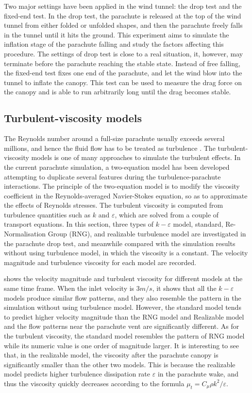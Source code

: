 Two major settings have been applied in the wind tunnel: the drop test and the fixed-end test. In the drop test, the parachute is released at the top of the wind tunnel from either folded or unfolded shapes, and then the parachute freely falls in the tunnel until it hits the ground. This experiment aims to simulate the inflation stage of the parachute falling and study the factors affecting this procedure. The settings of drop test is close to a real situation, it, however, may terminate before the parachute reaching the stable state. Instead of free falling, the fixed-end test fixes one end of the parachute, and let the wind blow into the tunnel to inflate the canopy. This test can be used to measure the drag force on the canopy and is able to run arbitrarily long until the drag becomes stable.
  
\subsection{Turbulent-viscosity models}
The Reynolds number around a full-size parachute usually exceeds several millions, and hence the fluid flow has to be treated as turbulence \cite{Johari05}. The turbulent-viscosity models is one of many approaches to simulate the turbulent effects. In the current parachute simulation, a two-equation model has been developed attempting to duplicate several features during the turbulence-parachute interactions. The principle of the two-equation model is to modify the viscosity coefficient in the Reynolds-averaged Navier-Stokes equation, so as to approximate the effects of Reynolds stresses. The turbulent viscosity is computed from turbulence quantities such as $k$ and $\varepsilon$, which are solved from a couple of transport equations. In this section, three types of $k-\varepsilon$ model, standard, Re-Normalisation Group (RNG), and realizable turbulence model are investigated in the parachute drop test, and meanwhile compared with the simulation results without using turbulence model, in which the viscosity is a constant. The velocity magnitude and turbulence viscosity for each model are recorded. 

 shows the velocity magnitude and turbulent viscosity for different models at the same time frame. When the inlet velocity is $3m/s$, it shows that all the $k-\varepsilon$ models produce similar flow patterns, and they also resemble the pattern in the simulation without using turbulence model. However, the standard model tends to predict higher velocity magnitude than the RNG model and Realizable model and the flow patterns near the parachute vent are significantly different. As for the turbulent viscosity, the standard model resembles the pattern of RNG model while its numeric value is one order of magnitude larger. It is interesting to see that, in the realizable model, the viscosity after the parachute canopy is significantly smaller than the other two models. This is because the realizable model predicts higher turbulence dissipation rate $\varepsilon$ in the parachute wake, and thus the viscosity quickly decreases according to the formula $\mu_{t} = C_{\mu}\rho k^2/\varepsilon$.

